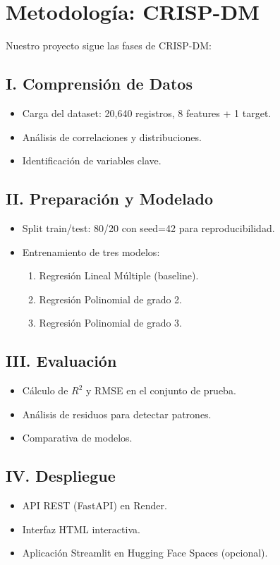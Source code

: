 \documentclass[11pt,a4paper]{article}
\begin{document}
\section{Metodología: CRISP-DM}

Nuestro proyecto sigue las fases de CRISP-DM:

\subsection{I. Comprensión de Datos}
\begin{itemize}
  \item Carga del dataset: 20,640 registros, 8 features + 1 target.
  \item Análisis de correlaciones y distribuciones.
  \item Identificación de variables clave.
\end{itemize}

\subsection{II. Preparación y Modelado}
\begin{itemize}
  \item Split train/test: 80/20 con seed=42 para reproducibilidad.
  \item Entrenamiento de tres modelos:
    \begin{enumerate}
      \item Regresión Lineal Múltiple (baseline).
      \item Regresión Polinomial de grado 2.
      \item Regresión Polinomial de grado 3.
    \end{enumerate}
\end{itemize}

\subsection{III. Evaluación}
\begin{itemize}
  \item Cálculo de $R^2$ y RMSE en el conjunto de prueba.
  \item Análisis de residuos para detectar patrones.
  \item Comparativa de modelos.
\end{itemize}

\subsection{IV. Despliegue}
\begin{itemize}
  \item API REST (FastAPI) en Render.
  \item Interfaz HTML interactiva.
  \item Aplicación Streamlit en Hugging Face Spaces (opcional).
\end{itemize}
\end{document}
